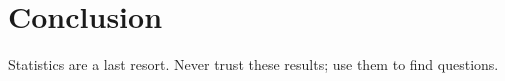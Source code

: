 \section{Conclusion}
Statistics are a last resort.
Never trust these results; use them to find questions.
